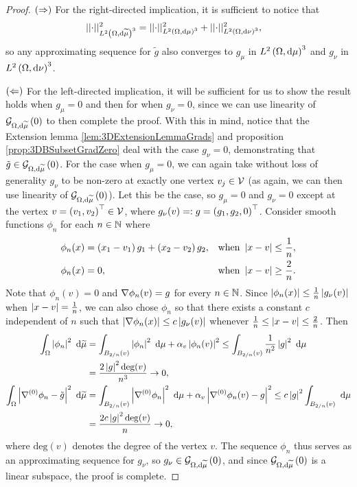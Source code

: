 \begin{proof}
	$\left( \Rightarrow \right)$ For the right-directed implication, it is sufficient to notice that
	\begin{align*}
		\lvert\lvert \cdot \rvert\rvert_{L^{2}\left( \Omega,\mathrm{d}\widetilde{\mu} \right)^3}^2 &= \lvert\lvert \cdot \rvert\rvert_{L^{2}\left( \Omega,\mathrm{d}\mu \right)^3}^2 + \lvert\lvert \cdot \rvert\rvert_{L^{2}\left( \Omega,\mathrm{d}\nu \right)^3}^2,
	\end{align*}
	so any approximating sequence for $\tilde{g}$ also converges to $g_\mu$ in $L^{2}\left( \Omega,\mathrm{d}\mu \right)^3$ and $g_\nu$ in $L^{2}\left( \Omega,\mathrm{d}\nu \right)^3$.
	
	$\left( \Leftarrow \right)$ For the left-directed implication, it will be sufficient for us to show the result holds when $g_\mu=0$ and then for when $g_\nu=0$, since we can use linearity of $\mathcal{G}_{ \Omega, \mathrm{d}\widetilde{\mu}}\left( 0 \right)$ to then complete the proof.
	With this in mind, notice that the Extension lemma \ref{lem:3DExtensionLemmaGrads} and proposition \ref{prop:3DBSubsetGradZero} deal with the case $g_\nu=0$, demonstrating that $\tilde{g}\in\mathcal{G}_{ \Omega, \mathrm{d}\widetilde{\mu}}\left( 0 \right)$.
	For the case when $g_\mu=0$, we can again take without loss of generality $g_\nu$ to be non-zero at exactly one vertex $v_j\in\mathcal{V}$ (as again, we can then use linearity of $\mathcal{G}_{ \Omega, \mathrm{d}\widetilde{\mu}}\left( 0 \right)$).
	Let this be the case, so $g_\mu=0$ and $g_\nu=0$ except at the vertex $v=\left( v_1,v_2 \right)^\top\in\mathcal{V}$, where $g_\nu(v) =: g = \left( g_1,g_2,0 \right)^\top$.
	Consider smooth functions $\phi_n$ for each $n\in\mathbb{N}$ where
	\begin{align*}
		\phi_n(x) &= \left( x_1-v_1 \right)g_1 + \left( x_2-v_2 \right)g_2, &\text{when } \left\lvert x-v \right\rvert\leq\frac{1}{n}, \\
		\phi_n(x) &= 0, &\text{when } \left\lvert x-v \right\rvert\geq\frac{2}{n}.
	\end{align*}
	Note that $\phi_n(v)=0$ and $\nabla\phi_n(v)=g$ for every $n\in\mathbb{N}$.
	Since $\left\lvert \phi_n(x) \right\rvert\leq\frac{1}{n}\left\lvert g_\nu(v) \right\rvert$ when $\left\lvert x-v \right\rvert=\frac{1}{n}$, we can also chose $\phi_n$ so that there exists a constant $c$ independent of $n$ such that $\left\lvert \nabla\phi_n(x) \right\rvert\leq c\left\lvert g_\nu(v) \right\rvert$ whenever $\frac{1}{n}\leq\left\lvert x-v \right\rvert\leq\frac{2}{n}$.
	Then
	\begin{align*}
		\int_{\Omega} \left\lvert \phi_n \right\rvert^2  \ \mathrm{d}\widetilde{\mu}
		&= \int_{B_{2/n}(v)} \left\lvert \phi_n \right\rvert^2  \ \mathrm{d}\mu + \alpha_v\left\lvert \phi_n(v) \right\rvert^2
		\leq \int_{B_{2/n}(v)} \frac{1}{n^2}\left\lvert g \right\rvert^2  \ \mathrm{d}\mu \\
		&= \frac{2\left\lvert g \right\rvert^2 \mathrm{deg}(v)}{n^3} \rightarrow 0, \\
		\int_{\Omega} \left\lvert \nabla^{(0)}\phi_n - \tilde{g} \right\rvert^2  \ \mathrm{d}\widetilde{\mu}
		&= \int_{B_{2/n}(v)} \left\lvert \nabla^{(0)}\phi_n \right\rvert^2  \ \mathrm{d}\mu + \alpha_v\left\lvert \nabla^{(0)}\phi_n(v) - g \right\rvert^2
		\leq c\left\lvert g \right\rvert^2\int_{B_{2/n}(v)} \ \mathrm{d}\mu \\
		&= \frac{2c\left\lvert g \right\rvert^2\mathrm{deg}(v)}{n} \rightarrow 0,
	\end{align*}
	where $\mathrm{deg}(v)$ denotes the degree of the vertex $v$.
	The sequence $\phi_n$ thus serves as an approximating sequence for $g_\nu$, so $g_\nu\in\mathcal{G}_{ \Omega, \mathrm{d}\widetilde{\mu}}\left( 0 \right)$, and since $\mathcal{G}_{ \Omega, \mathrm{d}\widetilde{\mu}}\left( 0 \right)$ is a linear subspace, the proof is complete.
\end{proof}

